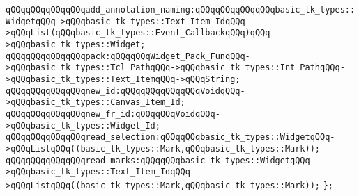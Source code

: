 \verb|qQQqqQQqqQQqqQQqadd_annotation_naming:qQQqqQQqqQQqqQQqbasic_tk_types::WidgetqQQq->qQQqbasic_tk_types::Text_Item_IdqQQq->qQQqList(qQQqbasic_tk_types::Event_CallbackqQQq)qQQq->qQQqbasic_tk_types::Widget;|\newline
\newline
\newline
\verb|qQQqqQQqqQQqqQQqpack:qQQqqQQqWidget_Pack_FunqQQq->qQQqbasic_tk_types::Tcl_PathqQQq->qQQqbasic_tk_types::Int_PathqQQq->qQQqbasic_tk_types::Text_ItemqQQq->qQQqString;|\newline
\newline
\newline
\verb|qQQqqQQqqQQqqQQqnew_id:qQQqqQQqqQQqqQQqVoidqQQq->qQQqbasic_tk_types::Canvas_Item_Id;|\newline
\verb|qQQqqQQqqQQqqQQqnew_fr_id:qQQqqQQqVoidqQQq->qQQqbasic_tk_types::Widget_Id;|\newline
\newline
\newline
\verb|qQQqqQQqqQQqqQQqread_selection:qQQqqQQqbasic_tk_types::WidgetqQQq->qQQqListqQQq((basic_tk_types::Mark,qQQqbasic_tk_types::Mark));|\newline
\newline
\verb|qQQqqQQqqQQqqQQqread_marks:qQQqqQQqbasic_tk_types::WidgetqQQq->qQQqbasic_tk_types::Text_Item_IdqQQq->qQQqListqQQq((basic_tk_types::Mark,qQQqbasic_tk_types::Mark));|\newline
\newline
\verb|};|\newline

